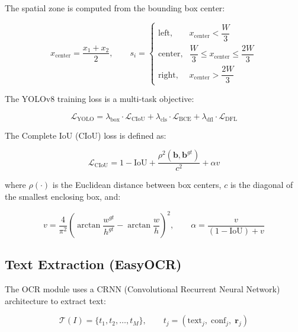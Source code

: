 The spatial zone is computed from the bounding box center:

\begin{equation}
x_{\text{center}} = \frac{x_1 + x_2}{2}, \qquad
s_i = 
\begin{cases}
    \text{left},   & x_{\text{center}} < \dfrac{W}{3} \\[6pt]
    \text{center}, & \dfrac{W}{3} \leq x_{\text{center}} \leq \dfrac{2W}{3} \\[6pt]
    \text{right},  & x_{\text{center}} > \dfrac{2W}{3}
\end{cases}
\end{equation}

The YOLOv8 training loss is a multi-task objective:

\begin{equation}
\mathcal{L}_{\text{YOLO}} = \lambda_{\text{box}} \cdot \mathcal{L}_{\text{CIoU}} + \lambda_{\text{cls}} \cdot \mathcal{L}_{\text{BCE}} + \lambda_{\text{dfl}} \cdot \mathcal{L}_{\text{DFL}}
\end{equation}

The Complete IoU (CIoU) loss is defined as:

\begin{equation}
\mathcal{L}_{\text{CIoU}} = 1 - \text{IoU} + \frac{\rho^2(\mathbf{b}, \mathbf{b}^{gt})}{c^2} + \alpha v
\end{equation}

where $\rho(\cdot)$ is the Euclidean distance between box centers, $c$ is the diagonal of the smallest enclosing box, and:

\begin{equation}
v = \frac{4}{\pi^2} \left( \arctan \frac{w^{gt}}{h^{gt}} - \arctan \frac{w}{h} \right)^2, \qquad
\alpha = \frac{v}{(1 - \text{IoU}) + v}
\end{equation}

\subsection{Text Extraction (EasyOCR)}

The OCR module uses a CRNN (Convolutional Recurrent Neural Network) architecture to extract text:

\begin{equation}
\mathcal{T}(I) = \{t_1, t_2, \ldots, t_M\}, \qquad t_j = (\text{text}_j,\; \text{conf}_j,\; \mathbf{r}_j)
\end{equation}

